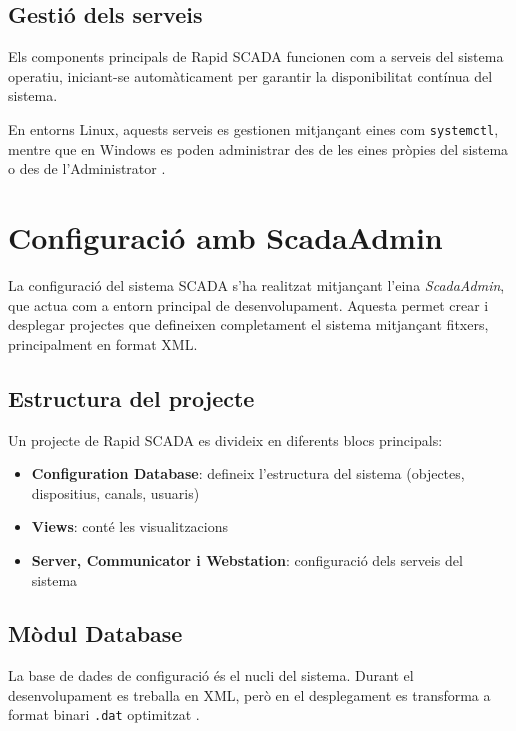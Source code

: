 \documentclass[12pt,a4paper]{report}
\begin{document}
\subsection{Gestió dels serveis}

Els components principals de Rapid SCADA funcionen com a serveis del sistema operatiu, iniciant-se automàticament per garantir la disponibilitat contínua del sistema.

En entorns Linux, aquests serveis es gestionen mitjançant eines com \texttt{systemctl}, mentre que en Windows es poden administrar des de les eines pròpies del sistema o des de l'Administrator \cite{rapidscada_services}.



\section{Configuració amb ScadaAdmin}

La configuració del sistema SCADA s'ha realitzat mitjançant l'eina \textit{ScadaAdmin}, que actua com a entorn principal de desenvolupament. \cite{rapidscada_config_basics}Aquesta permet crear i desplegar projectes que defineixen completament el sistema mitjançant fitxers, principalment en format XML.

\subsection{Estructura del projecte}

Un projecte de Rapid SCADA es divideix en diferents blocs principals:

\begin{itemize}
    \item \textbf{Configuration Database}: defineix l'estructura del sistema (objectes, dispositius, canals, usuaris)
    \item \textbf{Views}: conté les visualitzacions
    \item \textbf{Server, Communicator i Webstation}: configuració dels serveis del sistema
\end{itemize}

\subsection{Mòdul Database}

La base de dades de configuració és el nucli del sistema. Durant el desenvolupament es treballa en XML, però en el desplegament es transforma a format binari \texttt{.dat} optimitzat \cite{rapidscada_database}.
\end{document}
